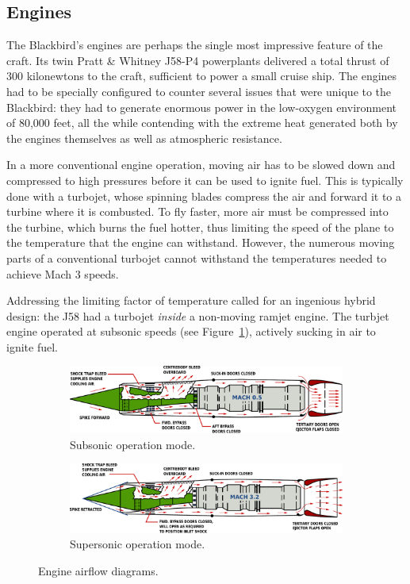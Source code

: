 \documentclass[12pt, draftnocls, onecolumn]{IEEEtran}
\newcommand{\figref}[1]{Figure~\ref{fig:#1}}
\begin{document}
	\subsection{Engines}
	The Blackbird's engines are perhaps the single most impressive feature of the craft. Its twin Pratt \& Whitney J58-P4 powerplants delivered a total thrust of 300 kilonewtons\cite{engines} to the craft, sufficient to power a small cruise ship. The engines had to be specially configured to counter several issues that were unique to the Blackbird: they had to generate enormous power in the low-oxygen environment of 80,000 feet, all the while contending with the extreme heat generated both by the engines themselves as well as atmospheric resistance.
	
	In a more conventional engine operation, moving air has to be slowed down and compressed to high pressures before it can be used to ignite fuel. This is typically done with a turbojet, whose spinning blades compress the air and forward it to a turbine where it is combusted. To fly faster, more air must be compressed into the turbine, which burns the fuel hotter, thus limiting the speed of the plane to the temperature that the engine can withstand. However, the numerous moving parts of a conventional turbojet cannot withstand the temperatures needed to achieve Mach 3 speeds.
	
	 Addressing the limiting factor of temperature called for an ingenious hybrid design: the J58 had a turbojet \emph{inside} a non-moving ramjet engine. The turbjet engine operated at subsonic speeds (see \figref{subsonic}), actively sucking in air to ignite fuel.
	 
	\begin{figure}[h]
	\centering
		\begin{subfigure}{0.8\textwidth}
			\includegraphics[width=\textwidth]{mach05.pdf}
			\caption{Subsonic operation mode.}\label{fig:subsonic}
		\end{subfigure}
		\begin{subfigure}{0.8\textwidth}
			\includegraphics[width=\textwidth]{mach32.pdf}
			\caption{Supersonic operation mode.}\label{fig:supersonic}
		\end{subfigure}
		\caption{Engine airflow diagrams.}
	\end{figure}
	
\end{document}
